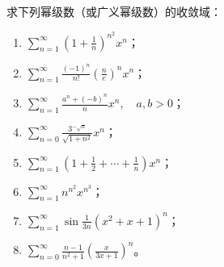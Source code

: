 \begin{xexercise}[5]
求下列幂级数（或广义幂级数）的收敛域：
  \begin{enumerate}[label=(\arabic*)]
    \item $\displaystyle\sum_{n=1}^{\infty}\left(1+\frac1n\right)^{n^2}x^n$；
    \item $\displaystyle\sum_{n=1}^{\infty}\frac{(-1)^n}{n!}\left(\frac ne\right)^n x^n$；
    \item $\displaystyle\sum_{n=1}^{\infty}\frac{a^n+(-b)^n}{n}x^n,\quad a,b>0$；
    \item $\displaystyle\sum_{n=0}^{\infty}\frac{3^{-\sqrt n}}{\sqrt{1+n^2}}x^n$；
    \item $\displaystyle\sum_{n=1}^{\infty}\left(1+\frac12+\cdots+\frac1n\right)x^n$；
    \item $\displaystyle\sum_{n=1}^{\infty}n^{n^2}x^{n^3}$；
    \item $\displaystyle\sum_{n=1}^{\infty}\sin\frac1{3n}(x^2+x+1)^n$；
    \item $\displaystyle\sum_{n=0}^{\infty}\frac{n-1}{n^2+1}\left(\frac{x}{3x+1}\right)^n$。
  \end{enumerate}
\end{xexercise}
